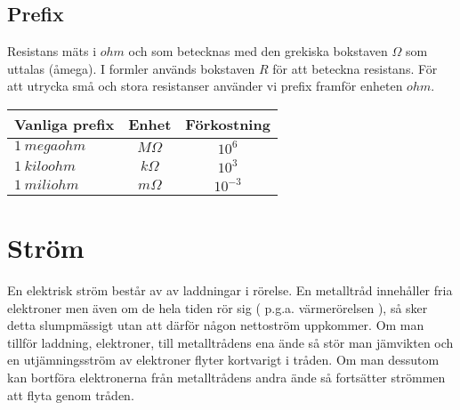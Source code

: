\documentclass[
]{book}
\begin{document}
\hypertarget{prefix-1}{%
\subsection{Prefix}\label{prefix-1}}

Resistans mäts i \(ohm\) och som betecknas med den grekiska bokstaven \(\Omega\) som uttalas (åmega).
I formler används bokstaven \(R\) för att beteckna resistans. För att utrycka små och stora resistanser använder vi prefix framför enheten \(ohm\).

\begin{longtable}[]{@{}lcc@{}}
\toprule()
Vanliga prefix & Enhet & Förkostning \\
\midrule()
\endhead
\(1 \ megaohm\) & \(M\Omega\) & \(10^{6}\) \\
\(1 \ kiloohm\) & \(k\Omega\) & \(10^{3}\) \\
\(1 \ miliohm\) & \(m\Omega\) & \(10^{-3}\) \\
\bottomrule()
\end{longtable}

\hypertarget{struxf6m}{%
\section{Ström}\label{struxf6m}}

En elektrisk ström består av av laddningar i rörelse. En metalltråd innehåller fria elektroner men även om de hela tiden rör sig ( p.g.a. värmerörelsen ), så sker detta slumpmässigt utan att därför någon nettoström uppkommer.
Om man tillför laddning, elektroner, till metalltrådens ena ände så stör man jämvikten och en utjämningsström av elektroner flyter kortvarigt i tråden. Om man dessutom kan bortföra elektronerna från metalltrådens andra ände så fortsätter strömmen att flyta genom tråden.
\end{document}

